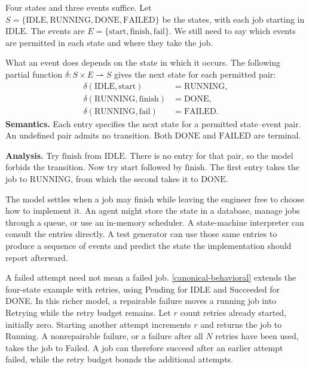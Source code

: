 Four states and three events suffice. Let \(S=\{\mathrm{IDLE},\mathrm{RUNNING},\mathrm{DONE},\mathrm{FAILED}\}\) be the states, with each job starting in \(\mathrm{IDLE}\). The events are \(E=\{\mathrm{start},\mathrm{finish},\mathrm{fail}\}\). We still need to say which events are permitted in each state and where they take the job.


What an event does depends on the state in which it occurs. The following partial function \(\delta:S\times E\rightharpoonup S\) gives the next state for each permitted pair:
\[
\begin{aligned}
\delta(\mathrm{IDLE},\mathrm{start}) &= \mathrm{RUNNING},\\
\delta(\mathrm{RUNNING},\mathrm{finish}) &= \mathrm{DONE},\\
\delta(\mathrm{RUNNING},\mathrm{fail}) &= \mathrm{FAILED}.
\end{aligned}
\]
\textbf{Semantics.} Each entry specifies the next state for a permitted state--event pair. An undefined pair admits no transition. Both \(\mathrm{DONE}\) and \(\mathrm{FAILED}\) are terminal.

\textbf{Analysis.} Try \(\mathrm{finish}\) from \(\mathrm{IDLE}\). There is no entry for that pair, so the model forbids the transition. Now try \(\mathrm{start}\) followed by \(\mathrm{finish}\). The first entry takes the job to \(\mathrm{RUNNING}\), from which the second takes it to \(\mathrm{DONE}\).

The model settles when a job may finish while leaving the engineer free to choose how to implement it. An agent might store the state in a database, manage jobs through a queue, or use an in-memory scheduler. A state-machine interpreter can consult the entries directly. A test generator can use those same entries to produce a sequence of events and predict the state the implementation should report afterward.

A failed attempt need not mean a failed job. \autoref{canonical-behavioral} extends the four-state example with retries, using Pending for IDLE and Succeeded for DONE. In this richer model, a repairable failure moves a running job into Retrying while the retry budget remains. Let $r$ count retries already started, initially zero. Starting another attempt increments $r$ and returns the job to Running. A nonrepairable failure, or a failure after all $N$ retries have been used, takes the job to Failed. A job can therefore succeed after an earlier attempt failed, while the retry budget bounds the additional attempts.

